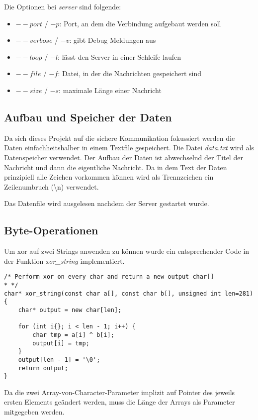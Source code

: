 \documentclass[]{article}
\begin{document}
\noindent
Die Optionen bei \textit{server} sind folgende:

\begin{itemize}
	\item $--port$ / $-p$: Port, an dem die Verbindung aufgebaut werden soll
	\item $--verbose$ / $-v$: gibt Debug Meldungen aus
	\item $--loop$ / $-l$: lässt den Server in einer Schleife laufen
	\item $--file$ / $-f$: Datei, in der die Nachrichten gespeichert sind
	\item $--size$ / $-s$: maximale Länge einer Nachricht
\end{itemize}

\subsection{Aufbau und Speicher der Daten}
Da sich dieses Projekt auf die sichere Kommunikation fokussiert werden die Daten einfachheitshalber in einem Textfile gespeichert. Die Datei \textit{data.txt} wird als Datenspeicher verwendet. Der Aufbau der Daten ist abwechselnd der Titel der Nachricht und dann die eigentliche Nachricht. Da in dem Text der Daten prinzipiell alle Zeichen vorkommen können wird als Trennzeichen ein Zeilenumbruch (\textbackslash n) verwendet.

Das Datenfile wird ausgelesen nachdem der Server gestartet wurde.

\subsection{Byte-Operationen}
Um xor auf zwei Strings anwenden zu können wurde ein entsprechender Code in der Funktion \textit{xor\_string} implementiert.

\begin{lstlisting}
/* Perform xor on every char and return a new output char[]
* */
char* xor_string(const char a[], const char b[], unsigned int len=281) {
	char* output = new char[len];
	
	for (int i{}; i < len - 1; i++) {
		char tmp = a[i] ^ b[i];
		output[i] = tmp;
	}
	output[len - 1] = '\0';
	return output;
}
\end{lstlisting}

Da die zwei Array-von-Character-Parameter implizit auf Pointer des jeweils ersten Elements geändert werden, muss die Länge der Arrays als Parameter mitgegeben werden.
\end{document}
